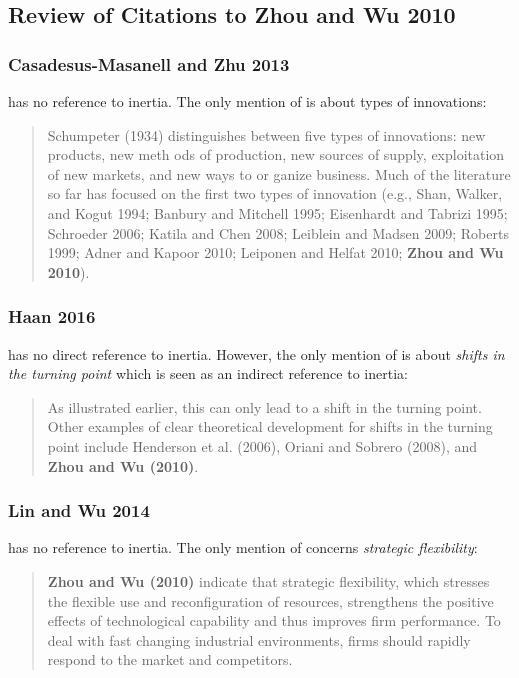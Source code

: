 \subsection{Review of Citations to Zhou and Wu 2010}

\subsubsection{Casadesus-Masanell and Zhu 2013}

\cite{casadesus2013business} has no reference to inertia. The only mention of \cite{zhou2010technological} is about types of innovations: \\
\begin{quotation}
	Schumpeter (1934) distinguishes between five types of innovations: new products, new meth
	ods of production, new sources of supply, exploitation of new markets, and new ways to or
	ganize business. Much of the literature so far has focused on the first two types of innovation
	(e.g., Shan, Walker, and Kogut 1994; Banbury and Mitchell 1995; Eisenhardt and Tabrizi
	1995; Schroeder 2006; Katila and Chen 2008; Leiblein and Madsen 2009; Roberts 1999; Adner
	and Kapoor 2010; Leiponen and Helfat 2010; \textbf{Zhou and Wu 2010}). \textellipsis
\end{quotation}

\subsubsection{Haan 2016}

\cite{haans2016thinking} has no direct reference to inertia. However, the only mention of \cite{zhou2010technological} is about \textit{shifts in the turning point} which is seen as an indirect reference to inertia: \\
\begin{quotation}
	\textellipsis As illustrated earlier, this can only lead to a shift in the
	turning point. Other examples of clear theoretical development for shifts in the turning point
	include Henderson et al. (2006), Oriani and Sobrero (2008), and \textbf{Zhou and Wu (2010)}.
\end{quotation}

\subsubsection{Lin and Wu 2014}

\cite{lin2014exploring} has no reference to inertia. The only mention of \cite{zhou2010technological} concerns \textit{strategic flexibility}:
\begin{quotation}
	\textellipsis \textbf{Zhou and Wu
	(2010)} indicate that strategic ﬂexibility, which stresses the ﬂexible use
	and reconﬁguration of resources, strengthens the positive effects of technological capability and thus improves ﬁrm performance. To deal with
	fast changing industrial environments, ﬁrms should rapidly respond to
	the market and competitors. \textellipsis
\end{quotation}

